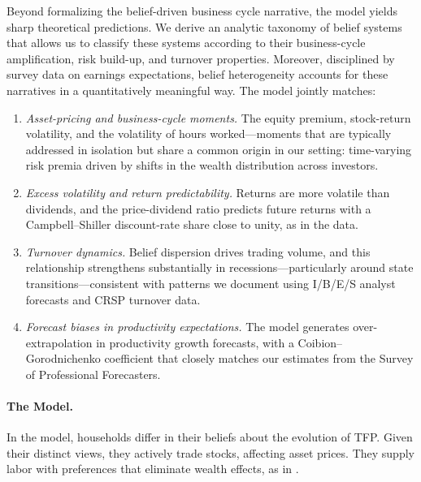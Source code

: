Beyond formalizing the belief-driven business cycle narrative, the model yields sharp theoretical predictions. We derive an analytic taxonomy of belief systems that allows us to classify these systems according to their business-cycle amplification, risk build-up, and turnover properties. Moreover, disciplined by survey data on earnings expectations, belief heterogeneity accounts for these narratives in a quantitatively meaningful way. The model jointly matches:
\begin{enumerate}
    \item \textit{Asset-pricing and business-cycle moments.} The equity premium, stock-return volatility, and the volatility of hours worked---moments that are typically addressed in isolation but share a common origin in our setting: time-varying risk premia driven by shifts in the wealth distribution across investors.

    \item \textit{Excess volatility and return predictability.} Returns are more volatile than dividends, and the price-dividend ratio predicts future returns with a Campbell--Shiller discount-rate share close to unity, as in the data.

    \item \textit{Turnover dynamics.} Belief dispersion drives trading volume, and this relationship strengthens substantially in recessions---particularly around state transitions---consistent with patterns we document using I/B/E/S analyst forecasts and CRSP turnover data.

    \item \textit{Forecast biases in productivity expectations.} The model generates over-extrapolation in productivity growth forecasts, with a Coibion--Gorodnichenko coefficient that closely matches our estimates from the Survey of Professional Forecasters.
\end{enumerate}

\paragraph{The Model.} 
In the model, households differ in their beliefs about the evolution of TFP. Given their distinct views, they actively trade stocks, affecting asset prices. They supply labor with preferences that eliminate wealth effects, as in \citet[henceforth GHH]{GHH88}. 

